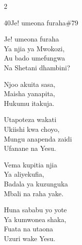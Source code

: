 \documentclass{article}
\begin{document}
\begin{multicols}{2}
\begin{hymn}{40}{Je! umeona furaha}{\#79}
\begin{stanza}
Je! umeona furaha\\
Ya njia ya Mwokozi,\\
Au bado umefungwa\\
Na Shetani dhambini?
\end{stanza}
\begin{chorus}
Njoo akuita sasa,\\
Maisha yanapita,\\
Hukumu itakuja.
\end{chorus}
\begin{stanza}
Utapoteza wakati\\
Ukiishi kwa choyo,\\
Mungu anapenda zaidi\\
Ufanane na Yesu.
\end{stanza}
\begin{stanza}
Vema kupitia njia\\
Ya aliyekufia,\\
Badala ya kuzunguka\\
Mbali na raha yake.
\end{stanza}
\begin{stanza}
Huna sababu yo yote\\
Ya kumwonea shaka,\\
Fuata na utaona\\
Uzuri wake Yesu.
\end{stanza}
\end{hymn}


\end{multicols}
\end{document}
